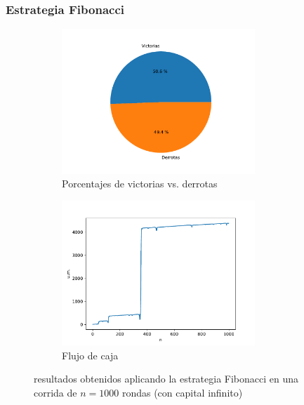 \documentclass{article}
\begin{document}
  \subsubsection{Estrategia Fibonacci}
  \begin{figure}[H]
    \centering
    \begin{subfigure}{0.5\textwidth}
      \centering
      \includegraphics[width=0.8\textwidth]{generated/porcentajes-fibonacci-no acotado.pdf}
      \caption{Porcentajes de victorias vs. derrotas}
    \end{subfigure}%
    \begin{subfigure}{0.5\textwidth}
      \centering
      \includegraphics[width=0.8\textwidth]{generated/capital-fibonacci-no acotado.pdf}
      \caption{Flujo de caja}
    \end{subfigure}
    \caption{resultados obtenidos aplicando la estrategia Fibonacci en una corrida de $n = 1000$ rondas (con capital infinito)}
  \end{figure}
\end{document}
